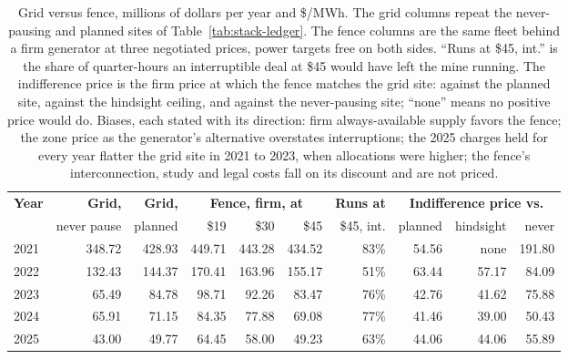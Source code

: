 \begin{table}[htbp]
  \centering
  \scriptsize
  \setlength{\tabcolsep}{1.6pt}
  \begin{tabular}{lrrrrrrrrr}
    \hline
    \textbf{Year} & \textbf{Grid,} & \textbf{Grid,} & \multicolumn{3}{c}{\textbf{Fence, firm, at}} & \textbf{Runs at} & \multicolumn{3}{c}{\textbf{Indifference price vs.}} \\
     & never pause & planned & \$19 & \$30 & \$45 & \$45, int. & planned & hindsight & never \\
    \hline
    2021 & 348.72 & 428.93 & 449.71 & 443.28 & 434.52 & 83\% & 54.56 & none & 191.80 \\
    2022 & 132.43 & 144.37 & 170.41 & 163.96 & 155.17 & 51\% & 63.44 & 57.17 & 84.09 \\
    2023 & 65.49 & 84.78 & 98.71 & 92.26 & 83.47 & 76\% & 42.76 & 41.62 & 75.88 \\
    2024 & 65.91 & 71.15 & 84.35 & 77.88 & 69.08 & 77\% & 41.46 & 39.00 & 50.43 \\
    2025 & 43.00 & 49.77 & 64.45 & 58.00 & 49.23 & 63\% & 44.06 & 44.06 & 55.89 \\
    \hline
  \end{tabular}
  \caption{Grid versus fence, millions of dollars per year and \$/MWh. The grid columns repeat the never-pausing and planned sites of Table~\ref{tab:stack-ledger}. The fence columns are the same fleet behind a firm generator at three negotiated prices, power targets free on both sides. ``Runs at \$45, int.'' is the share of quarter-hours an interruptible deal at \$45 would have left the mine running. The indifference price is the firm price at which the fence matches the grid site: against the planned site, against the hindsight ceiling, and against the never-pausing site; ``none'' means no positive price would do. Biases, each stated with its direction: firm always-available supply favors the fence; the zone price as the generator's alternative overstates interruptions; the 2025 charges held for every year flatter the grid site in 2021 to 2023, when allocations were higher; the fence's interconnection, study and legal costs fall on its discount and are not priced.} %
  \label{tab:stack-fence}
\end{table}

